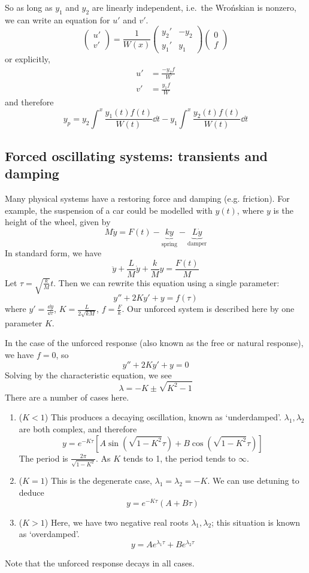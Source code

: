 So as long as \(y_1\) and \(y_2\) are linearly independent, i.e.\ the Wro\'nskian is nonzero, we can write an equation for \(u'\) and \(v'\).
\[
	\begin{pmatrix}
		u' \\ v'
	\end{pmatrix} = \frac{1}{W(x)}\begin{pmatrix}
		y_2' & -y_2 \\ y_1' & y_1
	\end{pmatrix} \begin{pmatrix}
		0 \\ f
	\end{pmatrix}
\]
or explicitly,
\begin{align*}
	u' & = \frac{-y_2 f}{W} \\
	v' & = \frac{y_1 f}{W}
\end{align*}
and therefore
\[
	y_p = y_2 \int^x \frac{y_1(t) f(t)}{W(t)}\dd{t} - y_1 \int^x \frac{y_2(t) f(t)}{W(t)}\dd{t}
\]

\subsection{Forced oscillating systems: transients and damping}
Many physical systems have a restoring force and damping (e.g.
friction).
For example, the suspension of a car could be modelled with \(y(t)\), where \(y\) is the height of the wheel, given by
\[
	M\ddot y = F(t) - \underbrace{ky}_{\text{spring}} - \underbrace{L\dot y}_{\text{damper}}
\]
In standard form, we have
\[
	\ddot y + \frac{L}{M} \dot y + \frac{k}{M} y = \frac{F(t)}{M}
\]
Let \(\tau = \sqrt{\frac{k}{M}} t\).
Then we can rewrite this equation using a single parameter:
\[
	y'' + 2Ky' + y = f(\tau)
\]
where \(y' = \frac{\dd{y}}{\dd \tau}\), \(K = \frac{L}{2\sqrt{kM}}\), \(f = \frac{F}{k}\).
Our unforced system is described here by one parameter \(K\).

In the case of the unforced response (also known as the free or natural response), we have \(f=0\), so
\[
	y'' + 2Ky' + y = 0
\]
Solving by the characteristic equation, we see
\[
	\lambda = -K \pm \sqrt{K^2 - 1}
\]
There are a number of cases here.
\begin{enumerate}
	\item (\(K < 1\)) This produces a decaying oscillation, known as `underdamped'.
	      \(\lambda_1, \lambda_2\) are both complex, and therefore
	      \[
		      y = e^{-K\tau}\left[A\sin(\sqrt{1-K^2}\tau) + B\cos(\sqrt{1-K^2}\tau)\right]
	      \]
	      The period is \(\frac{2\pi}{\sqrt{1-K^2}}\).
	      As \(K\) tends to 1, the period tends to \(\infty\).
	\item (\(K = 1\)) This is the degenerate case, \(\lambda_1 = \lambda_2 = -K\).
	      We can use detuning to deduce
	      \[
		      y = e^{-K\tau} (A + B\tau)
	      \]
	\item (\(K > 1\)) Here, we have two negative real roots \(\lambda_1, \lambda_2\); this situation is known as `overdamped'.
	      \[
		      y = Ae^{\lambda_1 \tau} + Be^{\lambda_2 \tau}
	      \]
\end{enumerate}
Note that the unforced response decays in all cases.

